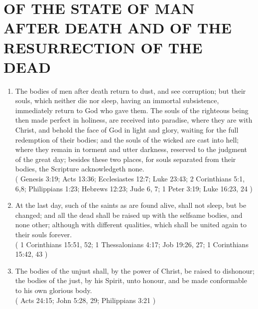 \documentclass[12pt,a4paper]{book}
\begin{document}
\chapter{OF THE STATE OF MAN AFTER DEATH AND OF THE RESURRECTION OF THE DEAD}
\label{ch-stat-dea}
\begin{enumerate}
\item The bodies of men after death return to dust, and see corruption; but their souls, which neither die nor sleep, having an immortal subsistence, immediately return to God who gave them. The souls of the righteous being then made perfect in holiness, are received into paradise, where they are with Christ, and behold the face of God in light and glory, waiting for the full redemption of their bodies; and the souls of the wicked are cast into hell; where they remain in torment and utter darkness, reserved to the judgment of the great day; besides these two places, for souls separated from their bodies, the Scripture acknowledgeth none.\\
( Genesis 3:19; Acts 13:36; Ecclesiastes 12:7; Luke 23:43; 2 Corinthians 5:1, 6,8; Philippians 1:23; Hebrews 12:23; Jude 6, 7; 1 Peter 3:19; Luke 16:23, 24 )
\item At the last day, such of the saints as are found alive, shall not sleep, but be changed; and all the dead shall be raised up with the selfsame bodies, and none other; although with different qualities, which shall be united again to their souls forever.\\
( 1 Corinthians 15:51, 52; 1 Thessalonians 4:17; Job 19:26, 27; 1 Corinthians 15:42, 43 )
\item The bodies of the unjust shall, by the power of Christ, be raised to dishonour; the bodies of the just, by his Spirit, unto honour, and be made conformable to his own glorious body.\\
( Acts 24:15; John 5:28, 29; Philippians 3:21 )
\end{enumerate}
\end{document}
